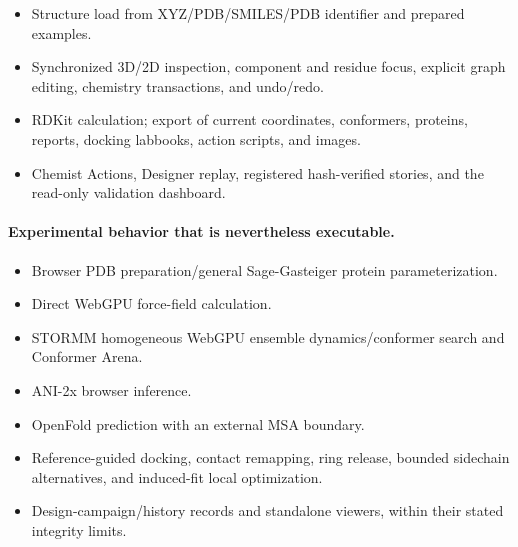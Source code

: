\documentclass[11pt]{article}
\begin{document}
\begin{small}
\begin{itemize}[leftmargin=*]
\item Structure load from XYZ/PDB/SMILES/PDB identifier and prepared examples.

\end{itemize}

\begin{itemize}[leftmargin=*]

\item Synchronized 3D/2D inspection, component and residue focus, explicit graph editing, chemistry transactions, and undo/redo.

\item RDKit calculation; export of current coordinates, conformers, proteins, reports, docking labbooks, action scripts, and images.

\item Chemist Actions, Designer replay, registered hash-verified stories, and the read-only validation dashboard.

\end{itemize}

\paragraph{Experimental behavior that is nevertheless executable.}

\begin{itemize}[leftmargin=*]

\item Browser PDB preparation/general Sage-Gasteiger protein parameterization.

\item Direct WebGPU force-field calculation.

\item STORMM homogeneous WebGPU ensemble dynamics/conformer search and Conformer Arena.

\item ANI-2x browser inference.

\item OpenFold prediction with an external MSA boundary.

\item Reference-guided docking, contact remapping, ring release, bounded sidechain alternatives, and induced-fit local optimization.

\item Design-campaign/history records and standalone viewers, within their stated integrity limits.

\end{itemize}


\end{small}
\end{document}
